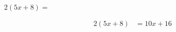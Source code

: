 $2(5x + 8) =$

\begin{solutionbox}{2cm}
    \begin{align*}
        2(5x + 8) & =10x+16
    \end{align*}
\end{solutionbox}